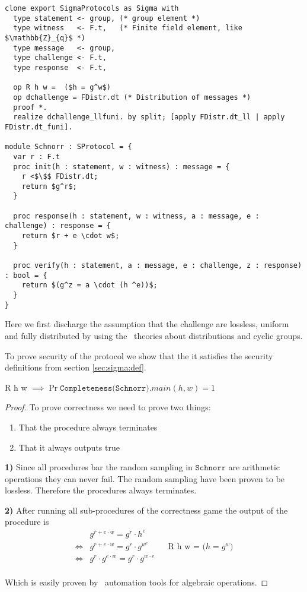 \begin{lstlisting}[mathescape,label=lst:sigma:schnorr,caption=Schnorr instantiation]
clone export SigmaProtocols as Sigma with
  type statement <- group, (* group element *)
  type witness   <- F.t,   (* Finite field element, like $\mathbb{Z}_{q}$ *)
  type message   <- group,
  type challenge <- F.t,
  type response  <- F.t,

  op R h w =  ($h = g^w$)
  op dchallenge = FDistr.dt (* Distribution of messages *)
  proof *.
  realize dchallenge_llfuni. by split; [apply FDistr.dt_ll | apply FDistr.dt_funi].

module Schnorr : SProtocol = {
  var r : F.t
  proc init(h : statement, w : witness) : message = {
    r <$\$$ FDistr.dt;
    return $g^r$;
  }

  proc response(h : statement, w : witness, a : message, e : challenge) : response = {
    return $r + e \cdot w$;
  }

  proc verify(h : statement, a : message, e : challenge, z : response) : bool = {
    return $(g^z = a \cdot (h ^e))$;
  }
}
\end{lstlisting}

Here we first discharge the assumption that the challenge are lossless, uniform
and fully distributed by using the \easycrypt\ theories about distributions and
cyclic groups.

To prove security of the protocol we show that the it satisfies the security
definitions from section \ref{sec:sigma:def}.

\begin{lemma}
  R h w $\implies \Pr{\texttt{Completeness(Schnorr)}.main(h,w)} = 1$
\end{lemma}
\begin{proof}
  To prove correctness we need to prove two things:
  \begin{enumerate}
    \item That the procedure always terminates
    \item That it always outputs true
  \end{enumerate}
  \textbf{1)} Since all procedures bar the random sampling in $\texttt{Schnorr}$ are arithmetic
  operations they can never fail. The random sampling have been proven to be
  lossless. Therefore the procedures always terminates.

  \noindent\textbf{2)} After running all sub-procedures of the correctness game
  the output of the procedure is
  \begin{align*}
         &g^{r + e \cdot w} = g^{r} \cdot h^{e} \\
    \iff &g^{r + e \cdot w} = g^{r} \cdot g^{w^{e}} && \text{R h w = ($h = g^{w}$)} \\
    \iff &g^{r} \cdot g^{e \cdot w} = g^{r} \cdot g^{w \cdot {e}} \\
  \end{align*}

  Which is easily proven by \easycrypt\ automation tools for algebraic operations.
\end{proof}

